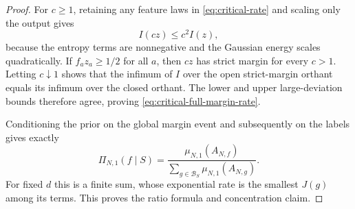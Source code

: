 \begin{proof}
For $c\geq1$, retaining any feature laws in \eqref{eq:critical-rate} and
scaling only the output gives
\[
 I(cz)\leq c^2 I(z),
\]
because the entropy terms are nonnegative and the Gaussian energy scales
quadratically. If $f_a z_a\geq1/2$ for all $a$, then $cz$ has strict
margin for every $c>1$. Letting $c\downarrow1$ shows that the infimum of
$I$ over the open strict-margin orthant equals its infimum over the
closed orthant. The lower and upper large-deviation bounds therefore agree,
proving \eqref{eq:critical-full-margin-rate}.

Conditioning the prior on the global margin event and subsequently on the
labels gives exactly
\[
 \Pi_{N,1}(f\mid S)=
 \frac{\mu_{N,1}(A_{N,f})}
 {\sum_{g\in\mathcal B_S}\mu_{N,1}(A_{N,g})}.
\]
For fixed $d$ this is a finite sum, whose exponential rate is the smallest
$J(g)$ among its terms. This proves the ratio formula and concentration
claim.
\end{proof}

